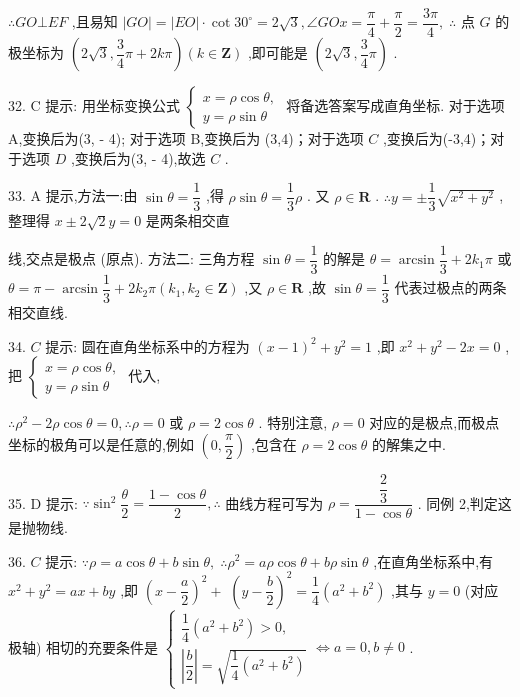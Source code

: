 $\therefore {GO} \bot  {EF}$ ,且易知 $\left| {GO}\right|  = \left| {EO}\right|  \cdot  \cot {30}^{ \circ  } = 2\sqrt{3},\angle {GOx} = \dfrac{\pi }{4} + \dfrac{\pi }{2} = \dfrac{3\pi }{4},\;\therefore$ 点 $G$ 的极坐标为 $\left( {2\sqrt{3},\dfrac{3}{4}\pi  + {2k\pi }}\right) \left( {k \in  \mathbf{Z}}\right)$ ,即可能是 $\left( {2\sqrt{3},\dfrac{3}{4}\pi }\right)$ .

32. C 提示: 用坐标变换公式 $\left\{  \begin{array}{l} x = \rho \cos \theta , \\  y = \rho \sin \theta  \end{array}\right.$ 将备选答案写成直角坐标. 对于选项 A,变换后为(3, - 4); 对于选项 B,变换后为 (3,4)；对于选项 $C$ ,变换后为(-3,4)；对于选项 $D$ ,变换后为(3, - 4),故选 $C$ .

33. A 提示,方法一:由 $\sin \theta  = \dfrac{1}{3}$ ,得 $\rho \sin \theta  = \dfrac{1}{3}\rho$ . 又 $\rho  \in  \mathbf{R}$ . $\therefore y =  \pm  \dfrac{1}{3}\sqrt{{x}^{2} + {y}^{2}}$ ,整理得 $x \pm  2\sqrt{2}y = 0$ 是两条相交直

线,交点是极点 (原点). 方法二: 三角方程 $\sin \theta  = \dfrac{1}{3}$ 的解是 $\theta  = \arcsin \dfrac{1}{3} + 2{k}_{1}\pi$ 或 $\theta  = \pi  - \arcsin \dfrac{1}{3} + 2{k}_{2}\pi \left( {{k}_{1},{k}_{2} \in  \mathbf{Z}}\right)$ ,又 $\rho  \in  \mathbf{R}$ ,故 $\sin \theta  = \dfrac{1}{3}$ 代表过极点的两条相交直线.

34. $C$ 提示: 圆在直角坐标系中的方程为 ${\left( x - 1\right) }^{2} + {y}^{2} = 1$ ,即 ${x}^{2} + {y}^{2} - {2x} = 0$ ,把 $\left\{  \begin{array}{l} x = \rho \cos \theta , \\  y = \rho \sin \theta  \end{array}\right.$ 代入,

$\therefore {\rho }^{2} - {2\rho }\cos \theta  = 0,\therefore \rho  = 0$ 或 $\rho  = 2\cos \theta$ . 特别注意, $\rho  = 0$ 对应的是极点,而极点坐标的极角可以是任意的,例如 $\left( {0,\dfrac{\pi }{2}}\right)$ ,包含在 $\rho  = 2\cos \theta$ 的解集之中.

35. D 提示: $\because {\sin }^{2}\dfrac{\theta }{2} = \dfrac{1 - \cos \theta }{2},\therefore$ 曲线方程可写为 $\rho  = \dfrac{\dfrac{2}{3}}{1 - \cos \theta }$ . 同例 2,判定这是抛物线.

36. $C$ 提示: $\because \rho  = a\cos \theta  + b\sin \theta ,\;\therefore {\rho }^{2} = {a\rho }\cos \theta  + {b\rho }\sin \theta$ ,在直角坐标系中,有 ${x}^{2} + {y}^{2} = {ax} + {by}$ ,即 ${\left( x - \dfrac{a}{2}\right) }^{2} +$  ${\left( y - \dfrac{b}{2}\right) }^{2} = \dfrac{1}{4}\left( {{a}^{2} + {b}^{2}}\right)$ ,其与 $y = 0$ (对应极轴) 相切的充要条件是 $\left\{  {\begin{array}{l} \dfrac{1}{4}\left( {{a}^{2} + {b}^{2}}\right)  > 0, \\  \left| \dfrac{b}{2}\right|  = \sqrt{\dfrac{1}{4}\left( {{a}^{2} + {b}^{2}}\right) } \end{array} \Leftrightarrow  a = 0,b \neq  0}\right.$ .

